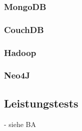 \subsubsection{MongoDB}

\subsubsection{CouchDB}

\subsubsection{Hadoop}

\subsubsection{Neo4J}


\subsection{Leistungstests}

- siehe BA
